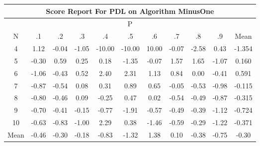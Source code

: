 \documentclass[11pt,a4paper]{report}
\begin{document}
\begin{longtable}{ | c || c | c | c | c | c | c | c | c | c || c |}
\hline
\multicolumn{11}{|c|}{ Score Report For PDL on Algorithm MinusOne} \\
\hline
\multicolumn{11}{|c|}{ P } \\
\hline
N & .1 & .2 & .3 & .4 & .5 & .6 & .7 & .8 & .9 & Mean\\
 \hline
 \hline
 \endhead
  4 &  \cellcolor[HTML]{DFDFFF} 1.12 &  \cellcolor[HTML]{FFFFFF} -0.04 &  \cellcolor[HTML]{FFE7E7} -1.05 &  \cellcolor[HTML]{FF0000} -10.00 &  \cellcolor[HTML]{FF0000} -10.00 &  \cellcolor[HTML]{0808FF} 10.00 &  \cellcolor[HTML]{FFFFFF} -0.07 &  \cellcolor[HTML]{FFBFBF} -2.58 &  \cellcolor[HTML]{F7F7FF} 0.43 & -1.354 \\
  5 &  \cellcolor[HTML]{FFF7F7} -0.30 &  \cellcolor[HTML]{EFEFFF} 0.59 &  \cellcolor[HTML]{F7F7FF} 0.25 &  \cellcolor[HTML]{F7F7FF} 0.18 &  \cellcolor[HTML]{FFDFDF} -1.35 &  \cellcolor[HTML]{FFFFFF} -0.07 &  \cellcolor[HTML]{D7D7FF} 1.57 &  \cellcolor[HTML]{D7D7FF} 1.65 &  \cellcolor[HTML]{FFE7E7} -1.07 & 0.160 \\
  6 &  \cellcolor[HTML]{FFE7E7} -1.06 &  \cellcolor[HTML]{FFF7F7} -0.43 &  \cellcolor[HTML]{EFEFFF} 0.52 &  \cellcolor[HTML]{BFBFFF} 2.40 &  \cellcolor[HTML]{C7C7FF} 2.31 &  \cellcolor[HTML]{DFDFFF} 1.13 &  \cellcolor[HTML]{E7E7FF} 0.84 &  \cellcolor[HTML]{FFFFFF} 0.00 &  \cellcolor[HTML]{FFF7F7} -0.41 & 0.591 \\
  7 &  \cellcolor[HTML]{FFE7E7} -0.87 &  \cellcolor[HTML]{FFEFEF} -0.54 &  \cellcolor[HTML]{FFFFFF} 0.08 &  \cellcolor[HTML]{F7F7FF} 0.31 &  \cellcolor[HTML]{E7E7FF} 0.89 &  \cellcolor[HTML]{EFEFFF} 0.65 &  \cellcolor[HTML]{FFFFFF} -0.05 &  \cellcolor[HTML]{FFEFEF} -0.53 &  \cellcolor[HTML]{FFE7E7} -0.98 & -0.115 \\
  8 &  \cellcolor[HTML]{FFE7E7} -0.80 &  \cellcolor[HTML]{FFF7F7} -0.46 &  \cellcolor[HTML]{FFFFFF} 0.09 &  \cellcolor[HTML]{FFF7F7} -0.25 &  \cellcolor[HTML]{F7F7FF} 0.47 &  \cellcolor[HTML]{FFFFFF} 0.02 &  \cellcolor[HTML]{FFEFEF} -0.54 &  \cellcolor[HTML]{FFEFEF} -0.49 &  \cellcolor[HTML]{FFE7E7} -0.87 & -0.315 \\
  9 &  \cellcolor[HTML]{FFEFEF} -0.70 &  \cellcolor[HTML]{FFF7F7} -0.41 &  \cellcolor[HTML]{FFFFFF} -0.15 &  \cellcolor[HTML]{FFEFEF} -0.77 &  \cellcolor[HTML]{FFCFCF} -1.91 &  \cellcolor[HTML]{FFEFEF} -0.57 &  \cellcolor[HTML]{FFEFEF} -0.49 &  \cellcolor[HTML]{FFF7F7} -0.39 &  \cellcolor[HTML]{FFDFDF} -1.12 & -0.724 \\
  10 &  \cellcolor[HTML]{FFEFEF} -0.63 &  \cellcolor[HTML]{FFE7E7} -0.83 &  \cellcolor[HTML]{FFE7E7} -1.00 &  \cellcolor[HTML]{C7C7FF} 2.29 &  \cellcolor[HTML]{F7F7FF} 0.38 &  \cellcolor[HTML]{FFD7D7} -1.46 &  \cellcolor[HTML]{FFEFEF} -0.59 &  \cellcolor[HTML]{FFF7F7} -0.29 &  \cellcolor[HTML]{FFDFDF} -1.22 & -0.371 \\
 \hline
 \hline
Mean &  \cellcolor[HTML]{FFF7F7} -0.46 &  \cellcolor[HTML]{FFF7F7} -0.30 &  \cellcolor[HTML]{FFF7F7} -0.18 &  \cellcolor[HTML]{FFE7E7} -0.83 &  \cellcolor[HTML]{FFDFDF} -1.32 &  \cellcolor[HTML]{DFDFFF} 1.38 &  \cellcolor[HTML]{FFFFFF} 0.10 &  \cellcolor[HTML]{FFF7F7} -0.38 &  \cellcolor[HTML]{FFEFEF} -0.75 &  \cellcolor[HTML]{FFF7F7} -0.30
\end{longtable}
\end{document}
